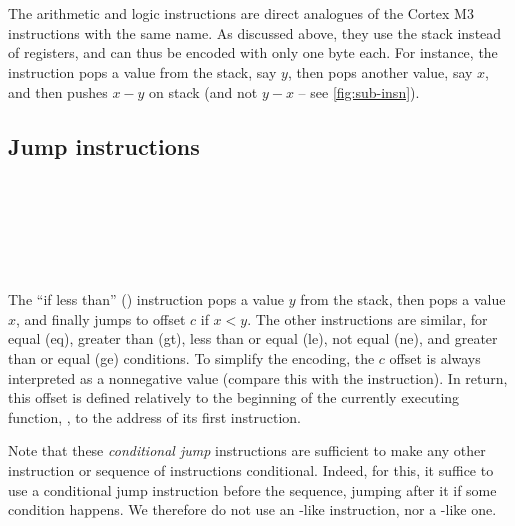\begin{Paragraph}
\\
\\
\\
\\
\\
\\
\\
\end{Paragraph}

The arithmetic and logic instructions are direct analogues of the Cortex M3
instructions with the same name. As discussed above, they use the stack instead
of registers, and can thus be encoded with only one byte each. For instance,
the  instruction pops a value from the stack, say $y$, then pops
another value, say $x$, and then pushes $x-y$ on stack (and not $y-x$ -- see
\cref{fig:sub-insn}).

\subsection{Jump instructions}

\begin{Paragraph}[]
\\
\\
\\
\\
\\
\end{Paragraph}

The ``if less than'' () instruction pops a value $y$ from the stack,
then pops a value $x$, and finally jumps to offset $c$ if $x<y$. The other
instructions are similar, for equal (eq), greater than (gt), less than or equal
(le), not equal (ne), and greater than or equal (ge) conditions. To simplify
the encoding, the $c$ offset is always interpreted as a nonnegative value
(compare this with the  instruction). In return, this offset is defined
relatively to the beginning of the currently executing function, \ie, to the
address of its first instruction.

Note that these {\em conditional jump} instructions are sufficient to make any
other instruction or sequence of instructions conditional. Indeed, for this, it
suffice to use a conditional jump instruction before the sequence, jumping
after it if some condition happens. We therefore do not use an -like
instruction, nor a -like one.

